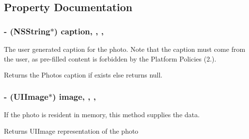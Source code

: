 \subsection{Property Documentation}
\hypertarget{interface_f_b_s_d_k_share_photo_a378bd927653780e0ad52400dd095c333}{}
\subsubsection[{caption}]{\setlength{\rightskip}{0pt plus 5cm}-\/ (N\+S\+String$\ast$) caption\hspace{0.3cm}{\ttfamily [read]}, {\ttfamily [write]}, {\ttfamily [nonatomic]}, {\ttfamily [copy]}}\label{interface_f_b_s_d_k_share_photo_a378bd927653780e0ad52400dd095c333}
The user generated caption for the photo. Note that the \textquotesingle{}caption\textquotesingle{} must come from the user, as pre-\/filled content is forbidden by the Platform Policies (2.). \begin{DoxyReturn}{Returns}
the Photo\textquotesingle{}s caption if exists else returns null. 
\end{DoxyReturn}
\hypertarget{interface_f_b_s_d_k_share_photo_a93f461424066ad2f65b58902d95d5470}{}
\subsubsection[{image}]{\setlength{\rightskip}{0pt plus 5cm}-\/ (U\+I\+Image$\ast$) image\hspace{0.3cm}{\ttfamily [read]}, {\ttfamily [write]}, {\ttfamily [nonatomic]}, {\ttfamily [strong]}}\label{interface_f_b_s_d_k_share_photo_a93f461424066ad2f65b58902d95d5470}
If the photo is resident in memory, this method supplies the data. \begin{DoxyReturn}{Returns}
U\+I\+Image representation of the photo 
\end{DoxyReturn}
\hypertarget{interface_f_b_s_d_k_share_photo_a499fdf232b43b9222e9db5f320bda63d}{}
